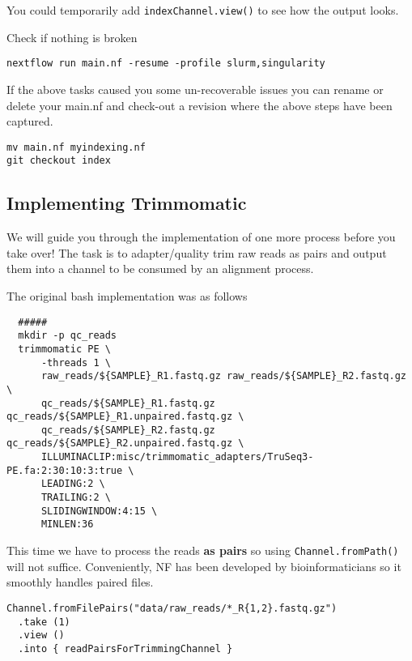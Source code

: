 You could temporarily add  \texttt{indexChannel.view()} to see how the output looks. 


\begin{steps}
Check if nothing is broken 
\begin{lstlisting}
nextflow run main.nf -resume -profile slurm,singularity
\end{lstlisting}
\end{steps}

\begin{note}
If the above tasks caused you some un-recoverable issues you can rename or delete your main.nf and check-out a revision where the above steps have been captured.
\begin{lstlisting}
mv main.nf myindexing.nf
git checkout index
\end{lstlisting}
\end{note}


\subsection{Implementing Trimmomatic}

We will guide you through the implementation of one more process before you take over!
The task is to adapter/quality trim raw reads as pairs and output them into a channel 
to be consumed by an alignment process.

The original bash implementation was as follows

\begin{lstlisting}
  #####
  mkdir -p qc_reads
  trimmomatic PE \
      -threads 1 \
      raw_reads/${SAMPLE}_R1.fastq.gz raw_reads/${SAMPLE}_R2.fastq.gz \
      qc_reads/${SAMPLE}_R1.fastq.gz qc_reads/${SAMPLE}_R1.unpaired.fastq.gz \
      qc_reads/${SAMPLE}_R2.fastq.gz qc_reads/${SAMPLE}_R2.unpaired.fastq.gz \
      ILLUMINACLIP:misc/trimmomatic_adapters/TruSeq3-PE.fa:2:30:10:3:true \
      LEADING:2 \
      TRAILING:2 \
      SLIDINGWINDOW:4:15 \
      MINLEN:36
\end{lstlisting}

This time we have to process the reads \textbf{as pairs} so using \texttt{Channel.fromPath()} 
will not suffice. Conveniently, NF has been developed by bioinformaticians so 
it smoothly handles paired files. 

\begin{lstlisting}
Channel.fromFilePairs("data/raw_reads/*_R{1,2}.fastq.gz")
  .take (1)
  .view ()
  .into { readPairsForTrimmingChannel }
\end{lstlisting}



